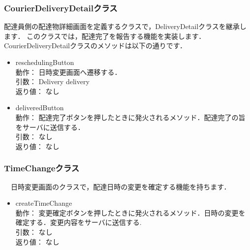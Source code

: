 \documentclass[a4j,titlepage]{jarticle}
\begin{document}
\subsubsection{CourierDeliveryDetailクラス}
配達員側の配達物詳細画面を定義するクラスで，DeliveryDetailクラスを継承します．
このクラスでは，配達完了を報告する機能を実装します．
CourierDeliveryDetailクラスのメソッドは以下の通りです．
\begin{itemize}
\item reschedulingButton\\
動作： 日時変更画面へ遷移する．\\
引数： Delivery delivery\\
返り値： なし

\item deliveredButton\\
動作： 配達完了ボタンを押したときに発火されるメソッド．配達完了の旨をサーバに送信する．\\
引数： なし\\
返り値： なし
\end{itemize}

\subsubsection{TimeChangeクラス}
　日時変更画面のクラスで，配達日時の変更を確定する機能を持ちます．
\begin{itemize}
\item createTimeChange\\
動作： 変更確定ボタンを押したときに発火されるメソッド．日時の変更を確定する．変更内容をサーバに送信する.\\
引数： なし\\
返り値： なし
\end{itemize}
\end{document}
